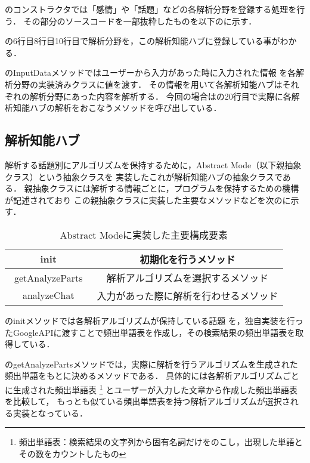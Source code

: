 のコンストラクタでは「感情」や「話題」などの各解析分野を登録する処理を行う．
その部分のソースコードを一部抜粋したものを以下のに示す．


の6行目8行目10行目で解析分野を，この解析知能ハブに登録している事がわかる．

のInputDataメソッドではユーザーから入力があった時に入力された情報
を各解析分野の実装済みクラスに値を渡す．
その情報を用いて各解析知能ハブはそれぞれの解析分野にあった内容を解析する．
今回の場合はの20行目で実際に各解析知能ハブの解析をおこなうメソッドを呼び出している．

\subsection{解析知能ハブ}
解析する話題別にアルゴリズムを保持するために，Abstract Mode（以下親抽象クラス）という抽象クラスを
実装したこれが解析知能ハブの抽象クラスである．
親抽象クラスには解析する情報ごとに，プログラムを保持するための機構が記述されており
この親抽象クラスに実装した主要なメソッドなどを次のに示す．

\begin{table}[tbh]
	\caption{Abstract Modeに実装した主要構成要素} \label{tab:Abstract Mode}
	\begin{center}
		\begin{tabular}[htb]{c|c}
		\hline
		init & 初期化を行うメソッド \\ \hline
		getAnalyzeParts　& 解析アルゴリズムを選択するメソッド \\ \hline
		analyzeChat & 入力があった際に解析を行わせるメソッド \\ \hline
		\end{tabular}
	\end{center}
\end{table}


のinitメソッドでは各解析アルゴリズムが保持している話題
を，独自実装を行ったGoogleAPIに渡すことで頻出単語表を作成し，その検索結果の頻出単語表を取得している．

のgetAnalyzePartsメソッドでは，実際に解析を行うアルゴリズムを生成された
頻出単語をもとに決めるメソッドである．
具体的には各解析アルゴリズムごとに生成された頻出単語表
\footnote{頻出単語表：検索結果の文字列から固有名詞だけをのこし，出現した単語とその数をカウントしたもの}
とユーザーが入力した文章から作成した頻出単語表を比較して，
もっとも似ている頻出単語表を持つ解析アルゴリズムが選択される実装となっている．
